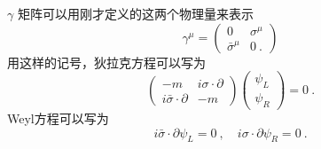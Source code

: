 $\gamma$ 矩阵可以用刚才定义的这两个物理量来表示
\begin{equation}
\gamma^\mu = \begin{pmatrix}
0 & \sigma^\mu \\
\bar \sigma^\mu & 0 ~.
\end{pmatrix}
\end{equation}
用这样的记号，狄拉克方程可以写为
\begin{equation}
\begin{pmatrix}
-m & i \sigma \cdot \partial \\
i \bar \sigma \cdot \partial & -m 
\end{pmatrix}\begin{pmatrix}
\psi_L \\ \psi_R
\end{pmatrix} = 0~.
\end{equation}
Weyl方程可以写为
\begin{equation}
i \bar \sigma \cdot \partial \psi_L = 0~, \quad i \sigma \cdot \partial \psi_R = 0~.
\end{equation}

